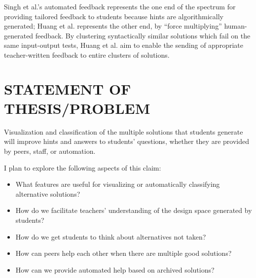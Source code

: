 \documentclass[12pt]{article}
\begin{document}
Singh et al.'s automated feedback represents the one end of the spectrum for providing tailored feedback to students because hints are algorithmically generated; Huang et al. \cite{MOOCshop} represents the other end, by ``force multiplying'' human-generated feedback. By clustering syntactically similar solutions which fail on the same input-output tests, Huang et al. aim to enable the sending of appropriate teacher-written feedback to entire clusters of solutions.

%

\section{STATEMENT OF THESIS/PROBLEM}

Visualization and classification of the multiple solutions that students generate will improve hints and answers to students' questions, whether they are provided by peers, staff, or automation. 

I plan to explore the following aspects of this claim:
\begin{itemize}

\item What features are useful for visualizing or automatically classifying alternative solutions?

\item How do we facilitate teachers' understanding of the design space generated by students?

\item How do we get students to think about alternatives not taken?

\item How can peers help each other when there are multiple good solutions?

\item How can we provide automated help based on archived solutions?

\end{itemize}
\end{document}
